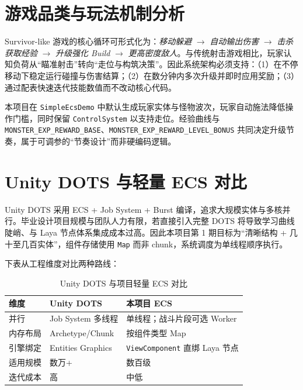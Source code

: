 ﻿
\section{游戏品类与玩法机制分析}

Survivor-like 游戏的核心循环可形式化为：\emph{移动躲避} $\rightarrow$ \emph{自动输出伤害} $\rightarrow$ \emph{击杀获取经验} $\rightarrow$ \emph{升级强化 Build} $\rightarrow$ \emph{更高密度敌人}。与传统射击游戏相比，玩家认知负荷从“瞄准射击”转向“走位与构筑决策”。因此系统架构必须支持：（1）在不停移动下稳定运行碰撞与伤害结算；（2）在数分钟内多次升级并即时应用奖励；（3）通过配表快速迭代技能数值而不改动核心代码\cite{gregory2018game,gregory2018game}。

本项目在 \texttt{SimpleEcsDemo} 中默认生成玩家实体与怪物波次，玩家自动施法降低操作门槛，同时保留 \texttt{ControlSystem} 以支持走位。经验曲线与 \texttt{MONSTER\_EXP\_REWARD\_BASE}、\texttt{MONSTER\_EXP\_REWARD\_LEVEL\_BONUS} 共同决定升级节奏，属于可调参的“节奏设计”而非硬编码逻辑。

\section{Unity DOTS 与轻量 ECS 对比}

Unity DOTS 采用 ECS + Job System + Burst 编译，追求大规模实体与多核并行\cite{gregory2018game}。毕业设计项目规模与团队人力有限，若直接引入完整 DOTS 将导致学习曲线陡峭、与 Laya 节点体系集成成本过高。因此本项目第 1 期目标为“清晰结构 + 几十至几百实体”，组件存储使用 \texttt{Map} 而非 chunk，系统调度为单线程顺序执行。

下表从工程维度对比两种路线：

\begin{table}[htbp]
  \centering
  \caption{Unity DOTS 与项目轻量 ECS 对比}
  \begin{tabular}{p{3.5cm}p{4.5cm}p{4.5cm}}
    \toprule
    \textbf{维度} & \textbf{Unity DOTS} & \textbf{本项目 ECS} \\
    \midrule
    并行 & Job System 多线程 & 单线程；战斗片段可选 Worker \\
    内存布局 & Archetype/Chunk & 按组件类型 Map \\
    引擎绑定 & Entities Graphics & \texttt{ViewComponent} 直绑 Laya 节点 \\
    适用规模 & 数万+ & 数百级 \\
    迭代成本 & 高 & 中低 \\
    \bottomrule
  \end{tabular}
\end{table}

